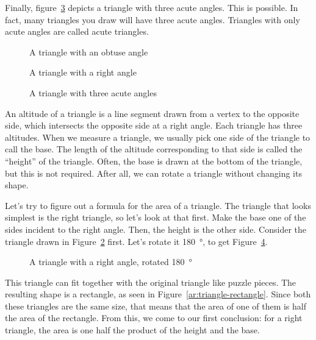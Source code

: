 \documentclass[a4paper,10pt]{report}
\begin{document}
Finally, figure~\ref{ar:triangle-acute} depicts a triangle with three acute
angles. This is possible. In fact, many triangles you draw will have three
acute angles. Triangles with only acute angles are called acute triangles.

\begin{figure}

  \caption{A triangle with an obtuse angle}
  \label{ar:triangle-obtuse}
\end{figure}

\begin{figure}

  \caption{A triangle with a right angle}
  \label{ar:triangle-right}
\end{figure}

\begin{figure}

  \caption{A triangle with three acute angles}
  \label{ar:triangle-acute}
\end{figure}

An altitude of a triangle is a line segment drawn from a vertex to the opposite
side, which intersects the opposite side at a right angle. Each triangle has
three altitudes. When we measure a triangle, we usually pick one side of the
triangle to call the base. The length of the altitude corresponding to that
side is called the ``height'' of the triangle. Often, the base is drawn at the
bottom of the triangle, but this is not required. After all, we can rotate a
triangle without changing its shape.

Let's try to figure out a formula for the area of a triangle. The triangle that
looks simplest is the right triangle, so let's look at that first. Make the
base one of the sides incident to the right angle. Then, the height is the
other side. Consider the triangle drawn in Figure~\ref{ar:triangle-right}
first. Let's rotate it \SI{180}{\degree}, to get
Figure~\ref{ar:triangle-right-rotated}.

\begin{figure}

  \caption{A triangle with a right angle, rotated \SI{180}{\degree}}
  \label{ar:triangle-right-rotated}
\end{figure}

This triangle can fit together with the original triangle like puzzle pieces.
The resulting shape is a rectangle, as seen in
Figure~\ref{ar:triangle-rectangle}. Since both these triangles are the same
size, that means that the area of one of them is half the area of the
rectangle. From this, we come to our first conclusion: for a right triangle,
the area is one half the product of the height and the base.
\end{document}
